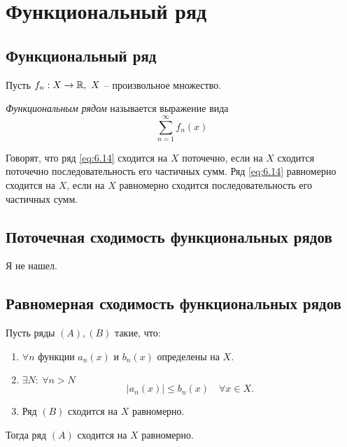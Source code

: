 \section{Функциональный ряд}

\setcounter{subsection}{76}

\subsection{Функциональный ряд}

\begin{definition}
    Пусть $f_n: X \rightarrow\mathbb{R}, \ X$ -- произвольное множество.

    \emph{Функциональным рядом} называется выражение вида
    \begin{equation}\label{eq:6.14}
        \sum_{n=1}^{\infty}f_n(x)
    \end{equation}

    Говорят, что ряд \ref{eq:6.14} сходится на $X$ поточечно, если на $X$ сходится поточечно последовательность его частичных сумм. Ряд \ref{eq:6.14} равномерно сходится на $X$, если на $X$ равномерно сходится последовательность его частичных сумм.
\end{definition}

\subsection{Поточечная сходимость функциональных рядов}

Я не нашел.

\subsection{Равномерная сходимость функциональных рядов}

\begin{theorem}
    Пусть ряды $ (A),(B) $ такие, что:
    \begin{enumerate}
        \item $\forall n$ функции $a_n(x)$ и $b_n(x)$ определены на $X$.
        \item $\exists N: \ \forall n > N$
              \[
                  \big|a_n(x)\big| \leqslant b_n(x) \quad \forall x \in X.
              \]
        \item Ряд $(B)$ сходится на $X$ равномерно.
    \end{enumerate}

    Тогда ряд $(A)$ сходится на $X$ равномерно.
\end{theorem}

